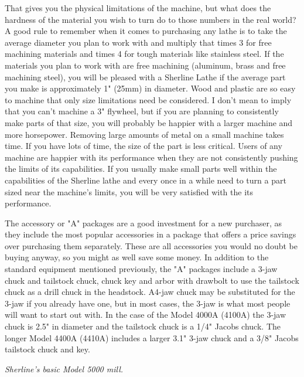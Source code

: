 That gives you the physical limitations of the machine, but what does the
hardness of the material you wish to turn do to those numbers in the real world?
A good rule to remember when it comes to purchasing any lathe is to take the
average diameter you plan to work with and multiply that times 3 for free
machining materials and times 4 for tough materials like stainless steel. If the
materials you plan to work with are free machining (aluminum, brass and free
machining steel), you will be pleased with a Sherline Lathe if the average part
you make is approximately 1" (25mm) in diameter. Wood and plastic are so easy to
machine that only size limitations need be considered. I don't mean to imply
that you can't machine a 3" flywheel, but if you are planning to consistently
make parts of that size, you will probably be happier with a larger machine and
more horsepower. Removing large amounts of metal on a small machine takes time.
If you have lots of time, the size of the part is less critical. Users of any
machine are happier with its performance when they are not consistently pushing
the limits of its capabilities. If you usually make small parts well within the
capabilities of the Sherline lathe and every once in a while need to turn a part
sized near the machine's limits, you will be very satisfied with the its
performance.


The accessory or "A" packages are a good investment for a new purchaser, as they
include the most popular accessories in a package that offers a price savings
over purchasing them separately. These are all accessories you would no doubt be
buying anyway, so you might as well save some money. In addition to the standard
equipment mentioned previously, the "A" packages include a 3-jaw chuck and
tailstock chuck, chuck key and arbor with drawbolt to use the tailstock chuck as
a drill chuck in the headstock. A4-jaw chuck may be substituted for the 3-jaw if
you already have one, but in most cases, the 3-jaw is what most people will want
to start out with. In the case of the Model 4000A (4100A) the 3-jaw chuck is
2.5" in diameter and the tailstock chuck is a 1/4" Jacobs chuck. The longer
Model 4400A (4410A) includes a larger 3.1" 3-jaw chuck and a 3/8" Jacobs
tailstock chuck and key.

\secup

\secdown

\textit{Sherline's basic Model 5000 mill.}
\bigskip

